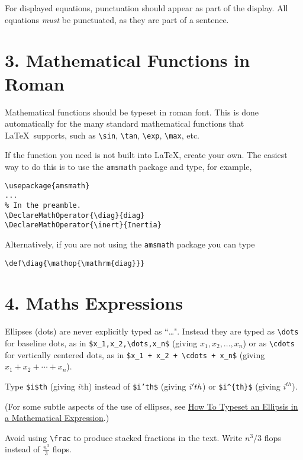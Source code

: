 \documentclass[12pt]{extarticle}
\begin{document}
For displayed equations, punctuation should appear as part of the display.
All equations \emph{must} be punctuated, as they are part of a sentence.

\section*{3. Mathematical Functions in Roman}
\label{sec-4}
Mathematical functions should be typeset in roman font.
This is done automatically for the many standard mathematical functions that 
\LaTeX\ supports, such as 
\texttt{\textbackslash{}sin},
\texttt{\textbackslash{}tan},
\texttt{\textbackslash{}exp},
\texttt{\textbackslash{}max},
etc.

If the function you need is not built into \LaTeX, create your own.
The easiest way to do this is to use the \texttt{amsmath} package and type,
for example,
\begin{verbatim}
\usepackage{amsmath}
...
% In the preamble.
\DeclareMathOperator{\diag}{diag}  
\DeclareMathOperator{\inert}{Inertia}
\end{verbatim}
Alternatively, if you are not using the \texttt{amsmath} package you can type
\begin{verbatim}
\def\diag{\mathop{\mathrm{diag}}}
\end{verbatim}

\section*{4. Maths Expressions}
\label{sec-5}
Ellipses (dots) are never explicitly typed as ``\ldots{}".
Instead they are typed as \texttt{\textbackslash{}dots} for baseline dots,
as in 
\texttt{\$x\_1,x\_2,\textbackslash{}dots,x\_n\$}
(giving $x_1,x_2,\dots,x_n$)
or as \texttt{\textbackslash{}cdots} for vertically centered dots, as in 
\texttt{\$x\_1 + x\_2 + \textbackslash{}cdots + x\_n\$}
(giving $x_1 + x_2 + \cdots + x_n$).

Type \texttt{\$i\$th} 
(giving $i$th)
instead of \texttt{\$i'th\$} (giving $i\rq th$)
or \texttt{\$i\textasciicircum{}\{th\}\$} (giving $i^{th}$).

(For some subtle aspects of the use of ellipses,
see \href{https://nickhigham.wordpress.com/2014/02/06/how-to-typeset-an-ellipsis-in-a-mathematical-expression}{How To Typeset an Ellipsis in a Mathematical Expression}.)

Avoid using \texttt{\textbackslash{}frac} to produce stacked fractions in the text.  Write
$n^3/3$ flops instead of $\frac{n^3}{3}$ flops.
\end{document}
